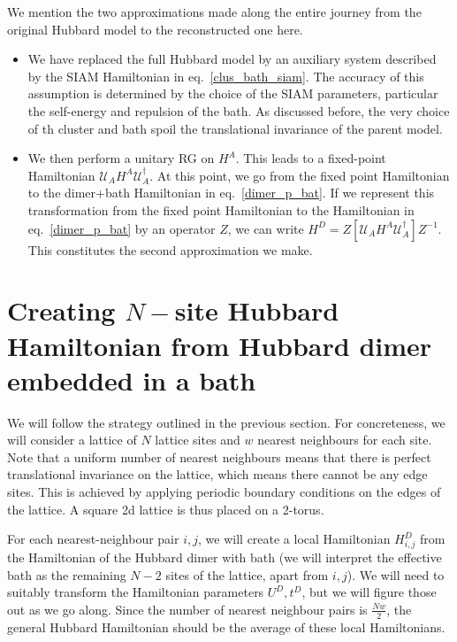 \documentclass{report}
\numberwithin{equation}{section}
\begin{document}
{ We mention the two approximations made along the entire journey from the original Hubbard model to the reconstructed one here.
 \begin{itemize}
 	\item We have replaced the full Hubbard model by an auxiliary system described by the SIAM Hamiltonian in eq.~\ref{clus_bath_siam}. The accuracy of this assumption is determined by the choice of the SIAM parameters, particular the self-energy and repulsion of the bath. As discussed before, the very choice of th cluster and bath spoil the translational invariance of the parent model.
 	\item We then perform a unitary RG on $H^A$. This leads to a fixed-point Hamiltonian $\mathcal{U}_A H^A \mathcal{U}_A^\dagger$. At this point, we go from the fixed point Hamiltonian to the dimer+bath Hamiltonian in eq.~\ref{dimer_p_bat}. If we represent this transformation from the fixed point Hamiltonian to the Hamiltonian in eq.~\ref{dimer_p_bat} by an operator \(Z\), we can write $H^D = Z\left[\mathcal{U}_A H^A \mathcal{U}_A^\dagger \right] Z^{-1}$. This constitutes the second approximation we make.
\end{itemize}
}


\section{Creating \(N-\)site Hubbard Hamiltonian from Hubbard dimer embedded in a bath}
We will follow the strategy outlined in the previous section. For concreteness, we will consider a lattice of \(N\) lattice sites and \(w\) nearest neighbours for each site. Note that a uniform number of nearest neighbours means that there is perfect translational invariance on the lattice, which means there cannot be any edge sites. This is achieved by applying periodic boundary conditions on the edges of the lattice. A square 2d lattice is thus placed on a 2-torus.

For each nearest-neighbour pair \(i,j\), we will create a local Hamiltonian \(H^D_{i,j}\) from the Hamiltonian of the Hubbard dimer with bath (we will interpret the effective bath as the remaining \(N-2\) sites of the lattice, apart from \(i,j\)). We will need to suitably transform the Hamiltonian parameters \(U^D, t^D\), but we will figure those out as we go along. Since the number of nearest neighbour pairs is \(\frac{Nw}{2}\), the general Hubbard Hamiltonian should be the average of these local Hamiltonians. 
\end{document}
